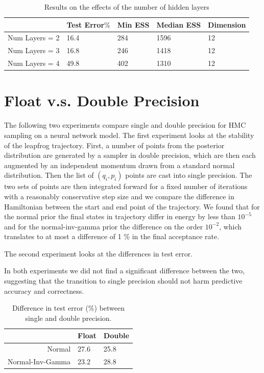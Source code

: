 \documentclass[12pt]{report}
\begin{document}
\begin{table}[]
\centering
\begin{tabular}{@{}lllll@{}}
\toprule
            & Test Error$\%$ & Min ESS & Median ESS & Dimension \\ \midrule
Num Layers = 2 & 16.4    & 284 & 1596       & 12        \\ \midrule
Num Layers = 3  & 16.8  & 246 & 1418     & 12        \\ \midrule
Num Layers = 4  & 49.8  & 402 & 1310    & 12        \\ \bottomrule
\end{tabular}
\caption{Results on the effects of the number of hidden layers}
\label{my-label}
\end{table}

\section{Float v.s. Double Precision}
The following two experiments compare single and double precision for HMC sampling on a neural network model. The first experiment looks at the stability of the leapfrog trajectory. First, a number of points from the posterior distribution are generated by a sampler in double precision, which are then each augmented by an independent momentum drawn from a standard normal distribution. Then the list of $(q_i,p_i)$ points are cast into single precision. The two sets of points are then integrated forward for a fixed number of iterations with a reasonably conservative step size and we compare the difference in Hamiltonian between the start and end point of the trajectory. We found that for the normal prior the final states in trajectory differ in energy by less than $10^{-5}$ and for the normal-inv-gamma prior the difference on the order $10^{-2}$, which translates to at most a difference of 1 $\%$ in the final acceptance rate.

The second experiment looks at the differences in test error. 


In both experiments we did not find a significant difference between the two, suggesting that the transition to single precision should not harm predictive accuracy and correctness. 

\begin{table}[]
\centering
\begin{tabular}{@{}rll@{}}
\toprule
\multicolumn{1}{l}{} & Float & \multicolumn{1}{r}{Double} \\ \midrule
Normal               & 27.6   & 25.8                         \\ \midrule
Normal-Inv-Gamma     & 23.2  & 28.8                         \\ \bottomrule
\end{tabular}
\caption{Difference in test error ($\%$) between single and double precision.}
\end{table}
\end{document}
